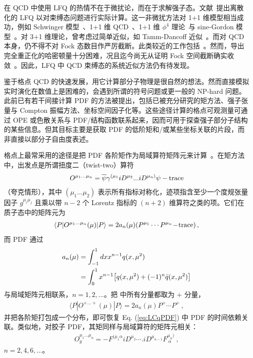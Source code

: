 在 QCD 中使用 LFQ 的热情不在于微扰论，而在于求解强子态。文献~\cite{Pauli:1985ps}提出离散化的 LFQ 以对束缚态问题进行实际计算。这一非微扰方法对 1+1 维模型相当成功，例如 Schwinger 模型~\cite{McCartor:1994im,Harada:1995au}、1+1 维 QCD~\cite{Burkardt:1989wy,Srivastava:2000cf}、1+1 维 $\phi^4$ 理论~\cite{Harindranath:1987db}与 sine-Gordon 模型~\cite{Burkardt:1992sz}。对 3+1 维理论，曾考虑过简单近似，如 Tamm-Dancoff 近似~\cite{Perry:1990mz}。而对 QCD 本身，仍不得不对 Fock 态数目作严厉截断。此类较近的工作包括~\cite{Vary:2009gt,Lan:2019vui,Jia:2019iyk}。然而，导出完全重正化的哈密顿量十分困难，况且迄今尚无从证明 Fock 空间截断确实收敛~\cite{Wilson:1994fk}。因此，LFQ 中 QCD 束缚态的系统近似方法仍有待发现。

鉴于格点 QCD 的快速发展，用它计算部分子物理是很自然的想法。然而直接模拟实时演化在数值上是困难的，会遇到所谓的符号问题或更一般的 NP-hard 问题。此前已有若干间接计算 PDF 的方法被提出，包括已被充分研究的矩方法、强子张量与 Compton 振幅方法、坐标空间因子化等。这些途径计算的格点可观测量可通过 OPE 或色散关系与 PDF/结构函数联系起来，因而可用于探查强子部分子结构的某些信息。但其目标主要是获取 PDF 的低阶矩和/或某些坐标关联的片段，而非直接以部分子自由度表述。

格点上最常采用的途径是把 PDF 各阶矩作为局域算符矩阵元来计算~\cite{Kronfeld:1984zv,Martinelli:1987si}。在矩方法中，出发点是所谓扭度二（twist-two）算符~\cite{Christ:1972ms}
\begin{align}
	O^{\mu_1...\mu_n}= {\overline \psi}\gamma^{(\mu_1}iD^{\mu_2} ... iD^{\mu_n)} \psi
	- {\rm trace}
	\label{eq:t2opq}
\end{align}
（夸克情形），其中 $(\mu_1...\mu_2)$ 表示所有指标对称化，迹项指含至少一个度规张量因子 $g^{\mu_i \mu_j}$ 且乘以带 $n-2$ 个 Lorentz 指标的 $(n+2)$ 维算符之类的项。它们在质子态中的矩阵元为
\begin{align}
	\langle P|O^{\mu_1...\mu_n}(\mu)|P\rangle =  2a_n(\mu) (P^{\mu_1}\cdots P^{\mu_n} \!-\! {\rm trace}) \,,
	\label{eq:t2mom}
\end{align}
而 PDF 通过
\begin{align}
	{a_n(\mu)} &= { \int^1_{-1} dx x^{n-1} q(x, \mu^2)}\nonumber\\
	&= \int^1_0 x^{n-1} \big[q(x, \mu^2)+(-1)^n \bar q(x, \mu^2)\big]
	\label{eq:t2sum}
\end{align}
与局域矩阵元相联系，$n=1,2,...$。把  中所有分量都取为 $+$ 分量，
\begin{align}
	\langle P|O^{+...+}(\mu)|P\rangle =2 a_n(\mu) P^+\cdots P^+ \,,
\end{align}
并把各阶矩打包成一个分布，即可恢复 Eq. (\ref{eq:LCqPDF}) 中 PDF 的时间依赖关联。类似地，对胶子 PDF，其矩同样与局域算符的矩阵元相关：
\begin{align}
	O_g^{\mu_1...\mu_n} = -F^{(\mu_1\alpha}iD^{\mu_2}\cdots .iD^{\mu_{n-1}}F^{\mu_n)}_{\ \alpha}\ ,
	\label{eq:t2opg}
\end{align}
$n=2,4,6,...$。

